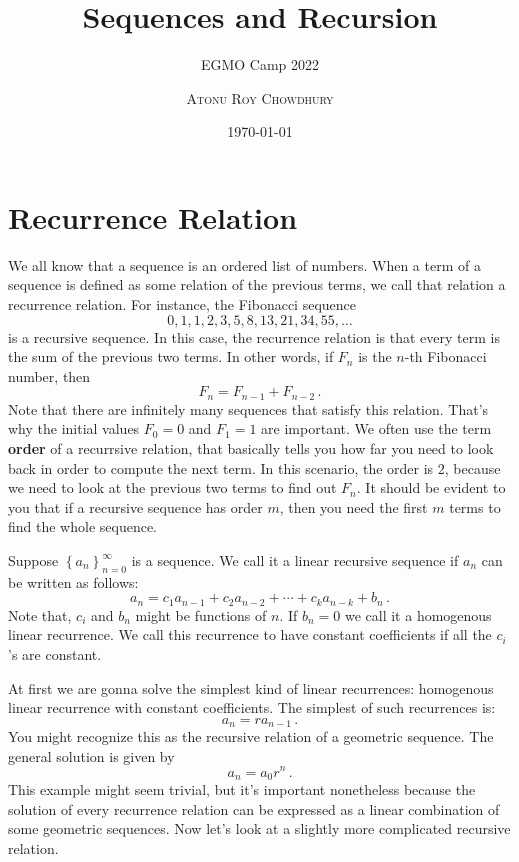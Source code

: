 \documentclass[11pt]{scrartcl}
\begin{document}
\title{Sequences and Recursion}
\subtitle{EGMO Camp 2022}
\author{\scshape{Atonu Roy Chowdhury} \\
}
\date{\today}
\maketitle

\section{Recurrence Relation}
We all know that a sequence is an ordered list of numbers. When a term of a sequence is defined as some relation of the previous terms, we call that relation a recurrence relation. For instance, the Fibonacci sequence
\[ 0,1,1,2,3,5,8,13,21,34, 55, \ldots \]
is a recursive sequence. In this case, the recurrence relation is that every term is the sum of the previous two terms. In other words, if \(F_n\) is the \(n\)-th Fibonacci number, then
\[ F_n = F_{n-1} + F_{n-2} \, . \]
Note that there are infinitely many sequences that satisfy this relation. That's why the initial values \(F_0 = 0\) and \(F_1 = 1\) are important. We often use the term \textbf{order} of a recurrsive relation, that basically tells you how far you need to look back in order to compute the next term. In this scenario, the order is \(2\), because we need to look at the previous two terms to find out \(F_{n}\). It should be evident to you that if a recursive sequence has order \(m\), then you need the first \(m\) terms to find the whole sequence.
\begin{defn}
Suppose \(\left\{a_n\right\}_{n=0}^{\infty}\) is a sequence. We call it a linear recursive sequence if \(a_n\) can be written as follows:
\[ a_n = c_1a_{n-1} + c_2 a_{n-2} + \cdots + c_k a_{n-k} + b_n \, .\]
Note that, \(c_i\) and \(b_n\) might be functions of \(n\). If \(b_n = 0\) we call it a homogenous linear recurrence. We call this recurrence to have constant coefficients if all the \(c_i\)'s are constant.
\end{defn}
At first we are gonna solve the simplest kind of linear recurrences: homogenous linear recurrence with constant coefficients. The simplest of such recurrences is:
\[ a_n = r a_{n-1} \, . \]
You might recognize this as the recursive relation of a geometric sequence. The general solution is given by
\[ a_n = a_0 r^n \, . \]
This example might seem trivial, but it's important nonetheless because the solution of every recurrence relation can be expressed as a linear combination of some geometric sequences. Now let's look at a slightly more complicated recursive relation.
\end{document}
